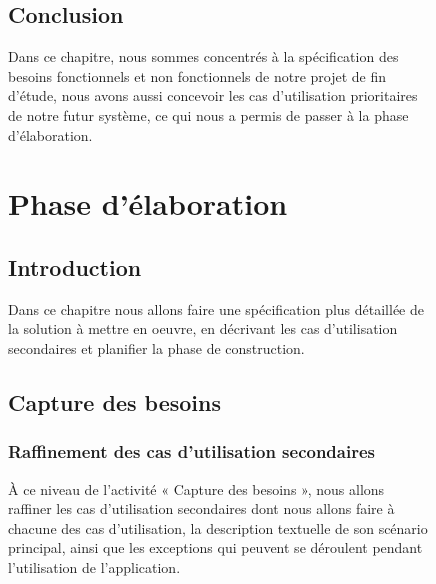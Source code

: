 \documentclass[12 pt]{report}
\begin{document}
\begin{figure}[h]
\begin{center}
\section*{Conclusion}  
Dans ce chapitre, nous sommes concentrés à la spécification des besoins fonctionnels et non fonctionnels de notre projet de fin d’étude, nous avons aussi concevoir les cas d’utilisation prioritaires de notre futur système, ce qui nous a permis de passer à la phase d’élaboration.

\chapter{Phase d’élaboration }
\section*{Introduction}  
Dans ce chapitre nous allons faire une spécification plus
détaillée de la solution à mettre en oeuvre, en décrivant les cas d'utilisation secondaires et planifier la phase de construction.
\section{Capture des besoins}
\subsection{Raffinement des cas d’utilisation secondaires}
À ce niveau de l’activité « Capture des besoins », nous allons raffiner les cas d'utilisation secondaires dont nous allons faire à chacune des cas d'utilisation, la description textuelle de son scénario principal, ainsi que les exceptions qui peuvent se déroulent pendant l'utilisation de l’application.
\newpage

\end{center}
\end{figure}
\end{document}
